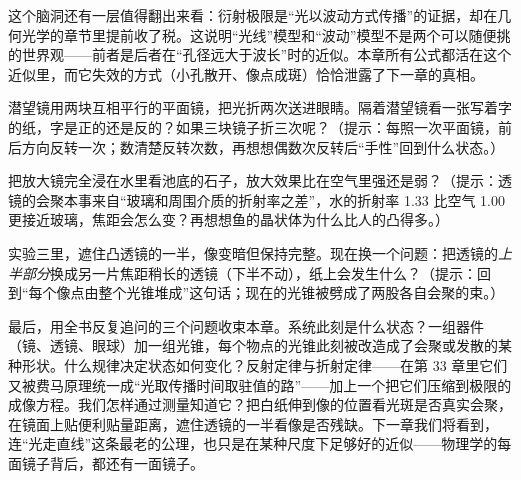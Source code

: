 \begin{mainline}
\begin{thought}[给月球上的国旗拍张照]
这个脑洞还有一层值得翻出来看：衍射极限是“光以波动方式传播”的证据，却在几何光学的章节里提前收了税。这说明“光线”模型和“波动”模型不是两个可以随便挑的世界观——前者是后者在“孔径远大于波长”时的近似。本章所有公式都活在这个近似里，而它失效的方式（小孔散开、像点成斑）恰恰泄露了下一章的真相。
\end{thought}

\begin{puzzles}
\item 潜望镜用两块互相平行的平面镜，把光折两次送进眼睛。隔着潜望镜看一张写着字的纸，字是正的还是反的？如果三块镜子折三次呢？（提示：每照一次平面镜，前后方向反转一次；数清楚反转次数，再想想偶数次反转后“手性”回到什么状态。）
\item 把放大镜完全浸在水里看池底的石子，放大效果比在空气里强还是弱？（提示：透镜的会聚本事来自“玻璃和周围介质的折射率之差”，水的折射率 1.33 比空气 1.00 更接近玻璃，焦距会怎么变？再想想鱼的晶状体为什么比人的凸得多。）
\item 实验三里，遮住凸透镜的一半，像变暗但保持完整。现在换一个问题：把透镜的\emph{上半部分}换成另一片焦距稍长的透镜（下半不动），纸上会发生什么？（提示：回到“每个像点由整个光锥堆成”这句话；现在的光锥被劈成了两股各自会聚的束。）
\end{puzzles}

最后，用全书反复追问的三个问题收束本章。系统此刻是什么状态？一组器件（镜、透镜、眼球）加一组光锥，每个物点的光锥此刻被改造成了会聚或发散的某种形状。什么规律决定状态如何变化？反射定律与折射定律——在第 33 章里它们又被费马原理统一成“光取传播时间取驻值的路”——加上一个把它们压缩到极限的成像方程。我们怎样通过测量知道它？把白纸伸到像的位置看光斑是否真实会聚，在镜面上贴便利贴量距离，遮住透镜的一半看像是否残缺。下一章我们将看到，连“光走直线”这条最老的公理，也只是在某种尺度下足够好的近似——物理学的每面镜子背后，都还有一面镜子。

\end{mainline}
